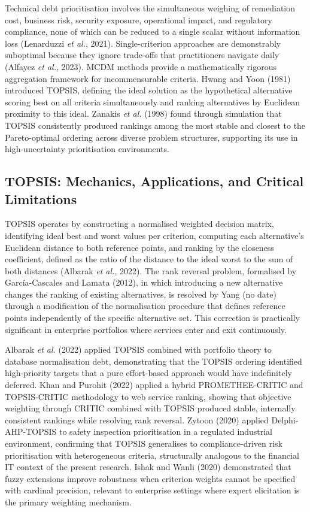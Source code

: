 \documentclass[
  british,
  12pt,
  a4paper,
]{report}
\begin{document}
Technical debt prioritisation involves the simultaneous weighing of
remediation cost, business risk, security exposure, operational impact,
and regulatory compliance, none of which can be reduced to a single
scalar without information loss (Lenarduzzi \emph{et al.}, 2021).
Single-criterion approaches are demonstrably suboptimal because they
ignore trade-offs that practitioners navigate daily (Alfayez \emph{et
al.}, 2023). MCDM methods provide a mathematically rigorous aggregation
framework for incommensurable criteria. Hwang and Yoon (1981) introduced
TOPSIS, defining the ideal solution as the hypothetical alternative
scoring best on all criteria simultaneously and ranking alternatives by
Euclidean proximity to this ideal. Zanakis \emph{et al.} (1998) found
through simulation that TOPSIS consistently produced rankings among the
most stable and closest to the Pareto-optimal ordering across diverse
problem structures, supporting its use in high-uncertainty
prioritisation environments.

\subsection{TOPSIS: Mechanics, Applications, and Critical
Limitations}\label{topsis-mechanics-applications-and-critical-limitations}

TOPSIS operates by constructing a normalised weighted decision matrix,
identifying ideal best and worst values per criterion, computing each
alternative's Euclidean distance to both reference points, and ranking
by the closeness coefficient, defined as the ratio of the distance to
the ideal worst to the sum of both distances (Albarak \emph{et al.},
2022). The rank reversal problem, formalised by García-Cascales and
Lamata (2012), in which introducing a new alternative changes the
ranking of existing alternatives, is resolved by Yang (no date) through
a modification of the normalisation procedure that defines reference
points independently of the specific alternative set. This correction is
practically significant in enterprise portfolios where services enter
and exit continuously.

Albarak \emph{et al.} (2022) applied TOPSIS combined with portfolio
theory to database normalisation debt, demonstrating that the TOPSIS
ordering identified high-priority targets that a pure effort-based
approach would have indefinitely deferred. Khan and Purohit (2022)
applied a hybrid PROMETHEE-CRITIC and TOPSIS-CRITIC methodology to web
service ranking, showing that objective weighting through CRITIC
combined with TOPSIS produced stable, internally consistent rankings
while resolving rank reversal. Zytoon (2020) applied Delphi-AHP-TOPSIS
to safety inspection prioritisation in a regulated industrial
environment, confirming that TOPSIS generalises to compliance-driven
risk prioritisation with heterogeneous criteria, structurally analogous
to the financial IT context of the present research. Ishak and Wanli
(2020) demonstrated that fuzzy extensions improve robustness when
criterion weights cannot be specified with cardinal precision, relevant
to enterprise settings where expert elicitation is the primary weighting
mechanism.
\end{document}

